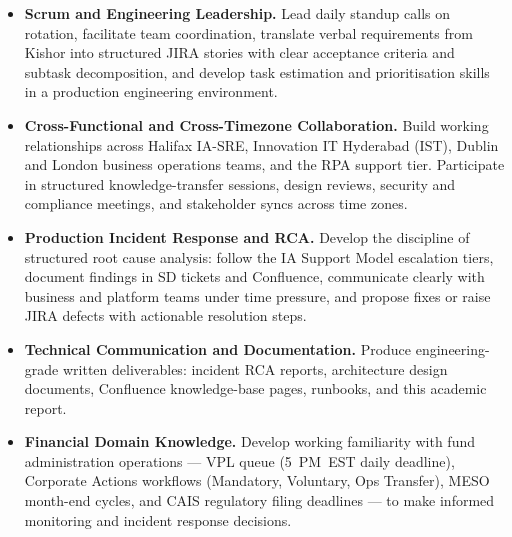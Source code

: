 \begin{itemize}

    \item \textbf{Scrum and Engineering Leadership.}
          Lead daily standup calls on rotation, facilitate team coordination,
          translate verbal requirements from Kishor into structured JIRA
          stories with clear acceptance criteria and subtask decomposition,
          and develop task estimation and prioritisation skills in a
          production engineering environment.

    \item \textbf{Cross-Functional and Cross-Timezone Collaboration.}
          Build working relationships across Halifax IA-SRE, Innovation IT
          Hyderabad (IST), Dublin and London business operations teams,
          and the RPA support tier. Participate in structured
          knowledge-transfer sessions, design reviews, security and
          compliance meetings, and stakeholder syncs across time zones.

    \item \textbf{Production Incident Response and RCA.}
          Develop the discipline of structured root cause analysis: follow
          the IA Support Model escalation tiers, document findings in SD
          tickets and Confluence, communicate clearly with business and
          platform teams under time pressure, and propose fixes or raise
          JIRA defects with actionable resolution steps.

    \item \textbf{Technical Communication and Documentation.}
          Produce engineering-grade written deliverables: incident RCA
          reports, architecture design documents, Confluence knowledge-base
          pages, runbooks, and this academic report.

    \item \textbf{Financial Domain Knowledge.}
          Develop working familiarity with fund administration operations ---
          VPL queue (5~PM~EST daily deadline), Corporate Actions workflows
          (Mandatory, Voluntary, Ops Transfer), MESO month-end cycles,
          and CAIS regulatory filing deadlines --- to make informed
          monitoring and incident response decisions.

\end{itemize}
